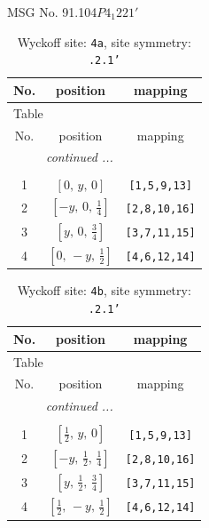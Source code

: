 \documentclass[fleqn,8pt]{jsarticle}
\begin{document}
\setcounter{MaxMatrixCols}{32}

\renewcommand{\tablename}{Table~}
\renewcommand{\figurename}{Figure~}
\begin{center}
\LARGE
MSG No. 91.104\quad$P4_{1}221'$
\end{center}
\renewcommand{\arraystretch}{1.2}
\begin{longtable}{ccc}
\caption{Wyckoff site: {\tt 4a}, site symmetry: {\tt .2.1'}}
 \\
 \hline \hline
No. & position & mapping \\ \hline \endfirsthead

\multicolumn{2}{l}{\tablename\ \thetable{}} \\
 \hline \hline
No. & position & mapping \\ \hline \endhead

 \hline \hline
\multicolumn{2}{r}{\footnotesize\it continued ...} \\ \endfoot

 \hline \hline
\multicolumn{2}{r}{} \\ \endlastfoot

1 & $\left[ 0,\, y,\, 0 \right]$ & {\tt [1,5,9,13]} \\ \hline
2 & $\left[ - y,\, 0,\, \frac{1}{4} \right]$ & {\tt [2,8,10,16]} \\ \hline
3 & $\left[ y,\, 0,\, \frac{3}{4} \right]$ & {\tt [3,7,11,15]} \\ \hline
4 & $\left[ 0,\, - y,\, \frac{1}{2} \right]$ & {\tt [4,6,12,14]} \\
\end{longtable}
\renewcommand{\arraystretch}{1.2}
\begin{longtable}{ccc}
\caption{Wyckoff site: {\tt 4b}, site symmetry: {\tt .2.1'}}
 \\
 \hline \hline
No. & position & mapping \\ \hline \endfirsthead

\multicolumn{2}{l}{\tablename\ \thetable{}} \\
 \hline \hline
No. & position & mapping \\ \hline \endhead

 \hline \hline
\multicolumn{2}{r}{\footnotesize\it continued ...} \\ \endfoot

 \hline \hline
\multicolumn{2}{r}{} \\ \endlastfoot

1 & $\left[ \frac{1}{2},\, y,\, 0 \right]$ & {\tt [1,5,9,13]} \\ \hline
2 & $\left[ - y,\, \frac{1}{2},\, \frac{1}{4} \right]$ & {\tt [2,8,10,16]} \\ \hline
3 & $\left[ y,\, \frac{1}{2},\, \frac{3}{4} \right]$ & {\tt [3,7,11,15]} \\ \hline
4 & $\left[ \frac{1}{2},\, - y,\, \frac{1}{2} \right]$ & {\tt [4,6,12,14]} \\
\end{longtable}
\end{document}
